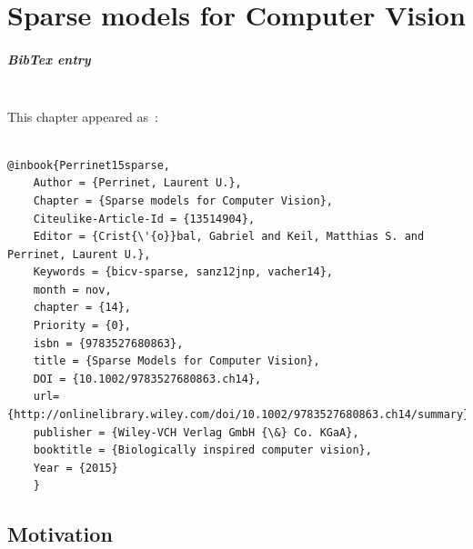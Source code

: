 \documentclass[a4paper, 11pt]{book}
\author{Perrinet}\title{\Title}
\newcommand{\AuthorA}{Laurent U.~Perrinet}%
\newcommand{\Title}{Sparse models for Computer Vision}%
\newcommand{\Abstract}{
The representation of images in the brain is known to be sparse.
That is, as neural activity is recorded in a visual area
---for instance the primary visual cortex of primates---
only a few neurons are active at a given time with respect to the whole population.
It is believed that such a property reflects the efficient match of the representation
with the statistics of natural scenes.
Applying such a paradigm to computer vision
therefore seems a promising approach towards more biomimetic algorithms.
Herein, we will describe a biologically-inspired approach to this problem.
First, we will describe an unsupervised learning paradigm
which is particularly adapted to the efficient coding of image patches.
Then, we will outline a complete multi-scale framework ---SparseLets---
implementing a biologically inspired sparse representation of natural images.
Finally, we will propose novel methods for integrating
prior information into these algorithms and provide some preliminary experimental results.
We will conclude by giving some perspective on applying such algorithms to computer vision.
More specifically, we will propose that bio-inspired approaches
may be applied to computer vision using predictive coding schemes,
sparse models being one simple and efficient instance of such schemes.
}%
\begin{document}
%
%
\frontmatter
\mainmatter
\addtocounter{chapter}{13} %
\chapter{\Title}

\paragraph{BibTex entry}~~\\

This chapter appeared as~\citep{Perrinet15sparse}:
\begin{verbatim}

@inbook{Perrinet15sparse,
	Author = {Perrinet, Laurent U.},
	Chapter = {Sparse models for Computer Vision},
	Citeulike-Article-Id = {13514904},
	Editor = {Crist{\'{o}}bal, Gabriel and Keil, Matthias S. and Perrinet, Laurent U.},
	Keywords = {bicv-sparse, sanz12jnp, vacher14},
    month = nov,
	chapter = {14},
	Priority = {0},
	isbn = {9783527680863},
	title = {Sparse Models for Computer Vision},
	DOI = {10.1002/9783527680863.ch14},
    url={http://onlinelibrary.wiley.com/doi/10.1002/9783527680863.ch14/summary},
    publisher = {Wiley-VCH Verlag GmbH {\&} Co. KGaA},
	booktitle = {Biologically inspired computer vision},
	Year = {2015}
	}
\end{verbatim}
\tableofcontents

\section{Motivation}
\end{document}
